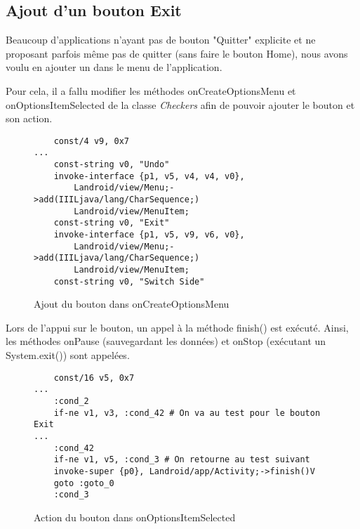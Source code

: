 
\subsection{Ajout d'un bouton Exit}

Beaucoup d'applications n'ayant pas de bouton "Quitter" explicite et ne proposant parfois même pas de quitter (sans faire le bouton Home),
nous avons voulu en ajouter un dans le menu de l'application.

Pour cela, il a fallu modifier les méthodes onCreateOptionsMenu et \hbox{onOptionsItemSelected} de la classe \textit{Checkers}
afin de pouvoir ajouter le bouton et son action.

\begin{figure}[!h]
\begin{verbatim}
    const/4 v9, 0x7
...
    const-string v0, "Undo"
    invoke-interface {p1, v5, v4, v4, v0},
        Landroid/view/Menu;->add(IIILjava/lang/CharSequence;)
        Landroid/view/MenuItem;
    const-string v0, "Exit"
    invoke-interface {p1, v5, v9, v6, v0},
        Landroid/view/Menu;->add(IIILjava/lang/CharSequence;)
        Landroid/view/MenuItem;
    const-string v0, "Switch Side"
\end{verbatim}
    \caption{Ajout du bouton dans onCreateOptionsMenu}
\end{figure}

Lors de l'appui sur le bouton, un appel à la méthode finish() est exécuté.
Ainsi, les méthodes onPause (sauvegardant les données) et onStop (exécutant un System.exit()) sont appelées.

\begin{figure}[!h]
\begin{verbatim}
    const/16 v5, 0x7
...
    :cond_2
    if-ne v1, v3, :cond_42 # On va au test pour le bouton Exit
...
    :cond_42
    if-ne v1, v5, :cond_3 # On retourne au test suivant
    invoke-super {p0}, Landroid/app/Activity;->finish()V
    goto :goto_0
    :cond_3
\end{verbatim}
    \caption{Action du bouton dans onOptionsItemSelected}
\end{figure}
